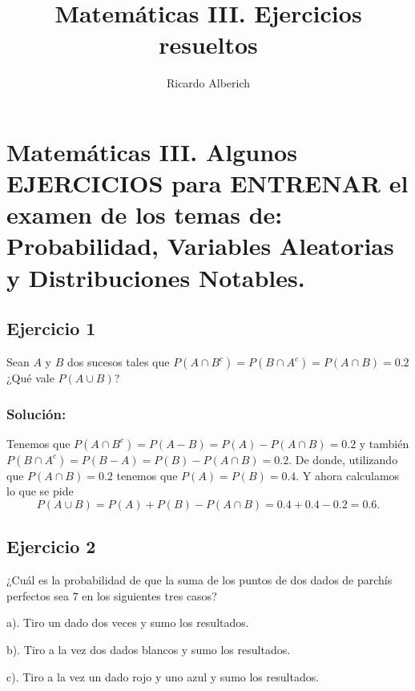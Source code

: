 \documentclass[
]{article}
\title{Matemáticas III. Ejercicios resueltos}
\author{Ricardo Alberich}
\date{}
\begin{document}
\maketitle

{
\hypersetup{linkcolor=blue}
\setcounter{tocdepth}{4}
\tableofcontents
}
\hypertarget{matemuxe1ticas-iii.-algunos-ejercicios-para-entrenar-el-examen-de-los-temas-de-probabilidad-variables-aleatorias-y-distribuciones-notables.}{%
\section{Matemáticas III. Algunos EJERCICIOS para ENTRENAR el examen de
los temas de: Probabilidad, Variables Aleatorias y Distribuciones
Notables.}\label{matemuxe1ticas-iii.-algunos-ejercicios-para-entrenar-el-examen-de-los-temas-de-probabilidad-variables-aleatorias-y-distribuciones-notables.}}

\hypertarget{ejercicio-1}{%
\subsection{Ejercicio 1}\label{ejercicio-1}}

Sean \(A\) y \(B\) dos sucesos tales que
\(P(A\cap B^c)=P(B\cap A^c)=P(A\cap B)=0.2\) ¿Qué vale \(P(A\cup B)\)?

\hypertarget{soluciuxf3n}{%
\subsubsection{Solución:}\label{soluciuxf3n}}

Tenemos que \(P(A\cap B^c)=P(A-B)=P(A)-P(A\cap B)=0.2\) y también
\(P(B\cap A^c)=P(B-A)=P(B)-P(A\cap B)=0.2\). De donde, utilizando que
\(P(A\cap B)=0.2\) tenemos que \(P(A)=P(B)=0.4\). Y ahora calculamos lo
que se pide \[P(A\cup B)=P(A)+P(B)-P(A\cap B)=0.4+0.4-0.2=0.6.\]

\hypertarget{ejercicio-2}{%
\subsection{Ejercicio 2}\label{ejercicio-2}}

¿Cuál es la probabilidad de que la suma de los puntos de dos dados de
parchís perfectos sea \(7\) en los siguientes tres casos?

a). Tiro un dado dos veces y sumo los resultados.

b). Tiro a la vez dos dados blancos y sumo los resultados.

c). Tiro a la vez un dado rojo y uno azul y sumo los resultados.
\end{document}
